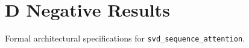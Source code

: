 \section{D Negative Results}

Formal architectural specifications for \texttt{svd_sequence_attention}.
